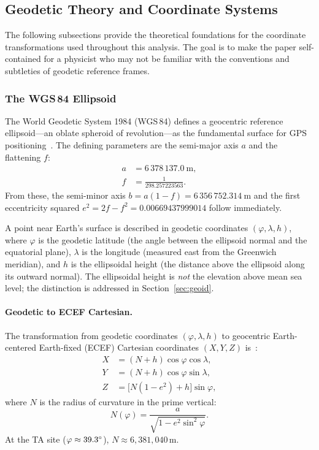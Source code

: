 
\subsection{Geodetic Theory and Coordinate Systems}
\label{sec:geodetic_theory}

The following subsections provide the theoretical foundations for the coordinate transformations used throughout this analysis. The goal is to make the paper self-contained for a physicist who may not be familiar with the conventions and subtleties of geodetic reference frames.

\subsubsection{The WGS\,84 Ellipsoid}
\label{sec:wgs84}

The World Geodetic System 1984 (WGS\,84) defines a geocentric reference ellipsoid---an oblate spheroid of revolution---as the fundamental surface for GPS positioning~\cite{nga2014}. The defining parameters are the semi-major axis $a$ and the flattening $f$:
\begin{align}
a &= 6\,378\,137.0~\text{m}, \label{eq:wgs84_a}\\
f &= \frac{1}{298.257223563}. \label{eq:wgs84_f}
\end{align}
From these, the semi-minor axis $b = a(1-f) = 6\,356\,752.314~\text{m}$ and the first eccentricity squared $e^2 = 2f - f^2 = 0.00669437999014$ follow immediately.

A point near Earth's surface is described in geodetic coordinates $(\varphi, \lambda, h)$, where $\varphi$ is the geodetic latitude (the angle between the ellipsoid normal and the equatorial plane), $\lambda$ is the longitude (measured east from the Greenwich meridian), and $h$ is the ellipsoidal height (the distance above the ellipsoid along its outward normal). The ellipsoidal height is \emph{not} the elevation above mean sea level; the distinction is addressed in Section~\ref{sec:geoid}.

\paragraph{Geodetic to ECEF Cartesian.} The transformation from geodetic coordinates $(\varphi, \lambda, h)$ to geocentric Earth-centered Earth-fixed (ECEF) Cartesian coordinates $(X, Y, Z)$ is~\cite{nga2014}:
\begin{align}
X &= (N + h)\cos\varphi\cos\lambda, \label{eq:geod2xyz_X}\\
Y &= (N + h)\cos\varphi\sin\lambda, \label{eq:geod2xyz_Y}\\
Z &= \bigl[N(1 - e^2) + h\bigr]\sin\varphi, \label{eq:geod2xyz_Z}
\end{align}
where $N$ is the radius of curvature in the prime vertical:
\begin{equation}
N(\varphi) = \frac{a}{\sqrt{1 - e^2 \sin^2\!\varphi}}.
\label{eq:radius_N}
\end{equation}
At the TA site ($\varphi \approx 39.3^\circ$), $N \approx 6{,}381{,}040$\,m.

